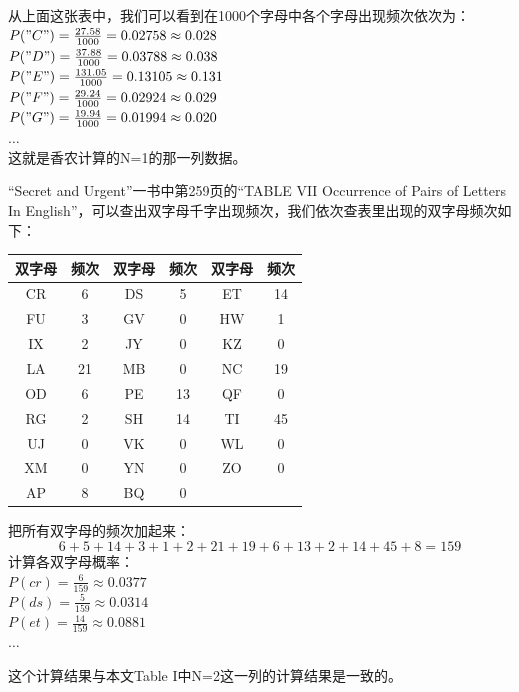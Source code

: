 \documentclass[]{article}
\begin{document}
从上面这张表中，我们可以看到在1000个字母中各个字母出现频次依次为：\\
$P("C")=\frac{27.58}{1000}=0.02758\approx 0.028$\\
$P("D")=\frac{37.88}{1000}=0.03788\approx 0.038$\\
$P("E")=\frac{131.05}{1000}=0.13105\approx 0.131$\\
$P("F")=\frac{29.24}{1000}=0.02924\approx 0.029$\\
$P("G")=\frac{19.94}{1000}=0.01994\approx 0.020$\\
$\ldots$\\
这就是香农计算的N=1的那一列数据。\par
\vspace{1cm}

“Secret and Urgent”一书中第259页的“TABLE VII Occurrence of Pairs of Letters In English”，可以查出双字母千字出现频次，我们依次查表里出现的双字母频次如下：\\
\begin{tabular}{|c|c||c|c||c|c|}
	\hline
	双字母& 频次 & 双字母 & 频次 & 双字母 & 频次 \\ 
	\hline  
	CR& 6 & DS & 5 & ET & 14 \\ 
	\hline 
	FU& 3 & GV & 0 & HW & 1 \\ 
	\hline 
	IX& 2 & JY & 0 & KZ & 0 \\ 
	\hline 
	LA& 21 & MB & 0 & NC & 19 \\ 
	\hline 
	OD& 6 & PE & 13 & QF & 0 \\ 
	\hline 
	RG& 2 & SH & 14 & TI & 45 \\ 
	\hline 
	UJ& 0 & VK & 0 & WL & 0 \\ 
	\hline 
	XM& 0 & YN & 0 & ZO & 0 \\ 
	\hline 
	AP& 8 & BQ & 0 &  &  \\ 
	\hline 
\end{tabular} 
\vspace{0.5cm}
\par
把所有双字母的频次加起来：
\[6+5+14+3+1+2+21+19+6+13+2+14+45+8=159\]
计算各双字母概率：\\
	$P(cr)=\frac{6}{159}\approx 0.0377$ \\
	$P(ds)=\frac{5}{159}\approx 0.0314$ \\
	$P(et)=\frac{14}{159}\approx 0.0881$ \\
    $\ldots$\par
这个计算结果与本文Table I中N=2这一列的计算结果是一致的。
 
\end{document}
